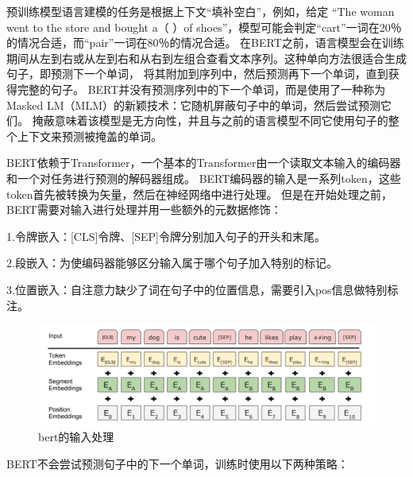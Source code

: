 预训练模型语言建模的任务是根据上下文“填补空白”\cite{marcelino2018transfer}，例如，给定
“The woman went to the store and bought a（ ）of shoes”，模型可能会判定“cart”一词在20％的情况合适，而“pair”一词在80％的情况合适。
在BERT之前，语言模型会在训练期间从左到右或从左到右和从右到左组合查看文本序列。这种单向方法很适合生成句子，即预测下一个单词，
将其附加到序列中，然后预测再下一个单词，直到获得完整的句子。
BERT并没有预测序列中的下一个单词，而是使用了一种称为Masked LM（MLM）的新颖技术：它随机屏蔽句子中的单词，然后尝试预测它们。
掩蔽意味着该模型是无方向性，并且与之前的语言模型不同它使用句子的整个上下文来预测被掩盖的单词。


BERT依赖于Transformer，一个基本的Transformer由一个读取文本输入的编码器和一个对任务进行预测的解码器组成。
BERT编码器的输入是一系列token，这些token首先被转换为矢量，然后在神经网络中进行处理。
但是在开始处理之前，BERT需要对输入进行处理并用一些额外的元数据修饰：

1.令牌嵌入：[CLS]令牌、[SEP]令牌分别加入句子的开头和末尾。

2.段嵌入：为使编码器能够区分输入属于哪个句子加入特别的标记。

3.位置嵌入：自注意力缺少了词在句子中的位置信息，需要引入pos信息做特别标注。
\begin{figure}[htbp]
  \centering
  \includegraphics[scale=0.5]{./images/inputBert.jpg}
  \caption{bert的输入处理\cite{devlin2018bert}}
  \label{fig:inputBert}
\end{figure}

BERT不会尝试预测句子中的下一个单词，训练时使用以下两种策略：

